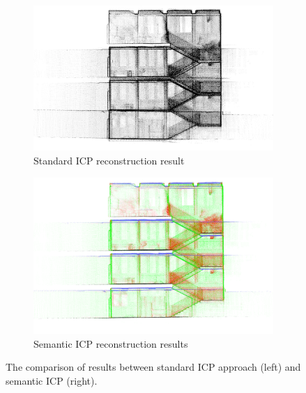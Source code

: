 \documentclass{article}
\begin{document}
\begin{figure} [h]
	\centering
	\begin{subfigure} [b]{0.49\textwidth}
        \centering
        \includegraphics[width=\textwidth]{ROB-15-0035_fig30a.png}
        \caption{Standard ICP reconstruction result}
   \end{subfigure}
   \begin{subfigure} [b]{0.49\textwidth}
        \centering
        \includegraphics[width=\textwidth]{ROB-15-0035_fig30b.png}
        \caption{Semantic ICP reconstruction results}
   \end{subfigure}
   \caption{The comparison of results between standard ICP approach (left) and semantic ICP (right).}
   \label{fig:comparisonArea2}
\end{figure}
\end{document}
